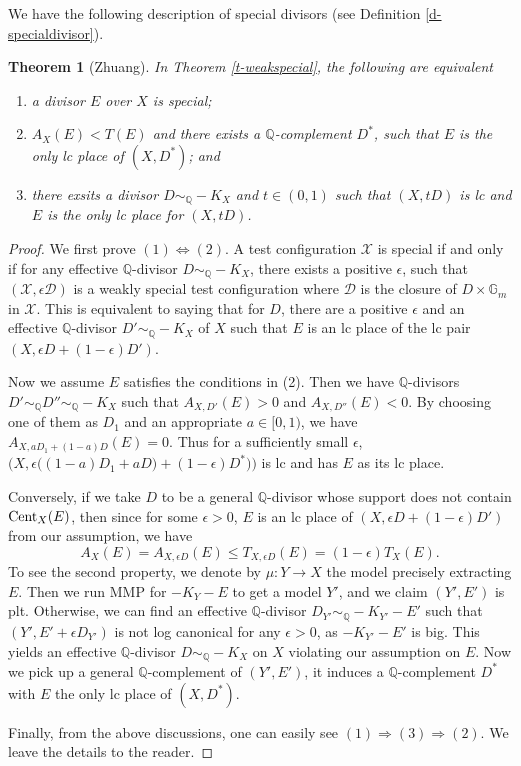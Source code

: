 \documentclass[12pt,reqno]{amsart}%
\newcommand{\cX}{{\mathcal{X}}}
\newtheorem{thm}{Theorem}[section]
\theoremstyle{definition}
\theoremstyle{remark}
\newcommand{\cD}{{\mathcal{D}}}
\newcommand{\bQ}{{\mathbb{Q}}}
\begin{document}
We have the following description of special divisors (see Definition \ref{d-specialdivisor}).
\begin{thm}[Zhuang]In Theorem \ref{t-weakspecial}, the following are equivalent
\begin{enumerate}
\item a divisor $E$ over $X$ is special;
\item $A_X(E)<T(E)$ and there exists a $\mathbb{Q}$-complement $D^*$, such that $E$ is the only lc place of $(X,D^*)$; and
\item there exsits a divisor $D\sim_{\mathbb {Q}}-K_X$ and $t\in (0,1)$ such that $(X,tD)$ is lc and $E$ is the only lc place for $(X,tD)$.
\end{enumerate}
\end{thm}
\begin{proof}We first prove $(1)\Longleftrightarrow (2)$. A test configuration $\cX$ is special if and only if for any effective $\mathbb{Q}$-divisor $D\sim_{\mathbb Q}-K_X$, there exists a positive $\epsilon$, such that $(\cX, \epsilon\cD)$ is a weakly special test configuration where $\cD$ is the closure of $D\times \mathbb{G}_m$ in $\cX$. This is equivalent to saying that for $D$, there are a positive $\epsilon$ and  an effective $\mathbb{Q}$-divisor $D'\sim_{\mathbb{Q}}-K_X$ of $X$ such that $E$ is an lc place of  the lc pair $(X,\epsilon D+(1-\epsilon)D')$.

Now we assume $E$ satisfies the conditions in (2). Then we have $\mathbb{Q}$-divisors $D'\sim_{\mathbb Q}D''\sim_{\mathbb Q}-K_X$ such that $A_{X,D'}(E)>0$ and $A_{X,D''}(E)<0$. By choosing one of them as $D_1$ and an appropriate $a\in [0,1)$, we have $A_{X,aD_1+(1-a)D}(E)=0$. 
Thus for a sufficiently small $\epsilon$, $\Big(X,\epsilon\big((1-a)D_1+aD\big)+(1-\epsilon)D^*)\Big)$ is lc and has $E$ as its lc place. 


Conversely, if we take $D$ to be a general $\mathbb{Q}$-divisor whose support does not contain ${\rm Cent}_X(E)$, then since for some $\epsilon>0$, $E$ is an lc place of $(X, \epsilon D+(1-\epsilon)D')$ from our assumption, we have 
$$A_X(E)=A_{X,\epsilon D}(E)\le T_{X,\epsilon D}(E)=(1-\epsilon)T_X(E).$$ 
To see the second property, we denote by $\mu\colon Y\to X$ the model precisely extracting $E$.  Then we run MMP for $-K_Y-E$ to get a model $Y'$, and we claim $(Y',E')$ is plt. Otherwise, we can find an effective $\bQ$-divisor $D_{Y'}\sim_{\mathbb{Q}}-K_{Y'}-E'$ such that $(Y', E'+ \epsilon D_{Y'})$ is not log canonical for any $\epsilon>0$, as $-K_{Y'}-E'$ is big. This yields an effective $\mathbb{Q}$-divisor $D\sim_{\mathbb{Q}}-K_X$ on $X$ violating our assumption on $E$. Now we pick up a general $\bQ$-complement of $(Y', E')$, it induces a $\bQ$-complement $D^*$ with $E$ the only lc place of $(X,D^*)$.  

Finally, from the above discussions, one can easily see $(1)\Longrightarrow (3)\Longrightarrow (2)$. We leave the details to the reader.
\end{proof}
\end{document}
